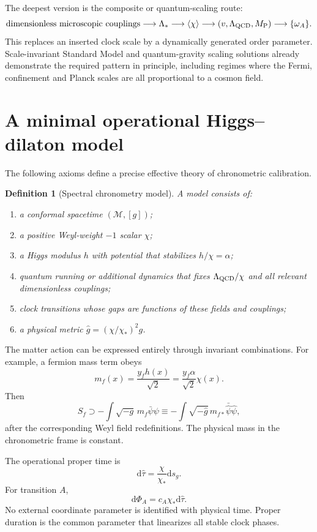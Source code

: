 \documentclass[11pt,a4paper]{article}
\newtheorem{definition}{Definition}[section]
\newcommand{\dd}{\mathrm{d}}
\newcommand{\M}{\mathcal{M}}
\newcommand{\MP}{M_{\mathrm P}}
\begin{document}
The deepest version is the composite or quantum-scaling route:
\[
 \text{dimensionless microscopic couplings}
 \longrightarrow
 \Lambda_*
 \longrightarrow
 \langle\chi\rangle
 \longrightarrow
 (v,\Lambda_{\rm QCD},\MP)
 \longrightarrow
 \{\omega_A\}.
\]
This replaces an inserted clock scale by a dynamically generated order parameter. Scale-invariant Standard Model and quantum-gravity scaling solutions already demonstrate the required pattern in principle, including regimes where the Fermi, confinement and Planck scales are all proportional to a cosmon field. \cite{Shaposhnikov2009,WetterichScale2024,WetterichQG2026}

\section{A minimal operational Higgs--dilaton model}

The following axioms define a precise effective theory of chronometric calibration.

\begin{definition}[Spectral chronometry model]
A model consists of:
\begin{enumerate}
  \item a conformal spacetime $(\M,[g])$;
  \item a positive Weyl-weight $-1$ scalar $\chi$;
  \item a Higgs modulus $h$ with potential that stabilizes $h/\chi=\alpha$;
  \item quantum running or additional dynamics that fixes $\Lambda_{\rm QCD}/\chi$ and all relevant dimensionless couplings;
  \item clock transitions whose gaps are functions of these fields and couplings;
  \item a physical metric $\widehat g=(\chi/\chi_*)^2g$.
\end{enumerate}
\end{definition}

The matter action can be expressed entirely through invariant combinations. For example, a fermion mass term obeys
\[
 m_f(x)=\frac{y_fh(x)}{\sqrt2}
 =\frac{y_f\alpha}{\sqrt2}\chi(x).
\]
Then
\[
 S_f\supset-\int\sqrt{-g}\,m_f\bar\psi\psi
\equiv
-\int\sqrt{-\widehat g}\,m_{f*}\bar{\widehat\psi}\widehat\psi,
\]
after the corresponding Weyl field redefinitions. The physical mass in the chronometric frame is constant.

The operational proper time is
\[
 \dd\widehat\tau=\frac{\chi}{\chi_*}\dd s_g.
\]
For transition $A$,
\[
 \dd\Phi_A=c_A\chi_*\dd\widehat\tau.
\]
No external coordinate parameter is identified with physical time. Proper duration is the common parameter that linearizes all stable clock phases.
\end{document}
